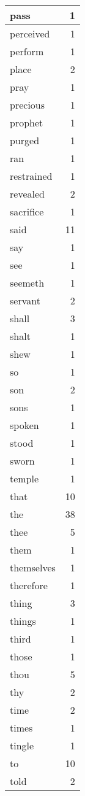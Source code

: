 \begin{center}
\begin{longtable}{l|r}
pass & 1 \\ \hline
perceived & 1 \\ \hline
perform & 1 \\ \hline
place & 2 \\ \hline
pray & 1 \\ \hline
precious & 1 \\ \hline
prophet & 1 \\ \hline
purged & 1 \\ \hline
ran & 1 \\ \hline
restrained & 1 \\ \hline
revealed & 2 \\ \hline
sacrifice & 1 \\ \hline
said & 11 \\ \hline
say & 1 \\ \hline
see & 1 \\ \hline
seemeth & 1 \\ \hline
servant & 2 \\ \hline
shall & 3 \\ \hline
shalt & 1 \\ \hline
shew & 1 \\ \hline
so & 1 \\ \hline
son & 2 \\ \hline
sons & 1 \\ \hline
spoken & 1 \\ \hline
stood & 1 \\ \hline
sworn & 1 \\ \hline
temple & 1 \\ \hline
that & 10 \\ \hline
the & 38 \\ \hline
thee & 5 \\ \hline
them & 1 \\ \hline
themselves & 1 \\ \hline
therefore & 1 \\ \hline
thing & 3 \\ \hline
things & 1 \\ \hline
third & 1 \\ \hline
those & 1 \\ \hline
thou & 5 \\ \hline
thy & 2 \\ \hline
time & 2 \\ \hline
times & 1 \\ \hline
tingle & 1 \\ \hline
to & 10 \\ \hline
told & 2 \\ \hline

\end{longtable}
\end{center}
